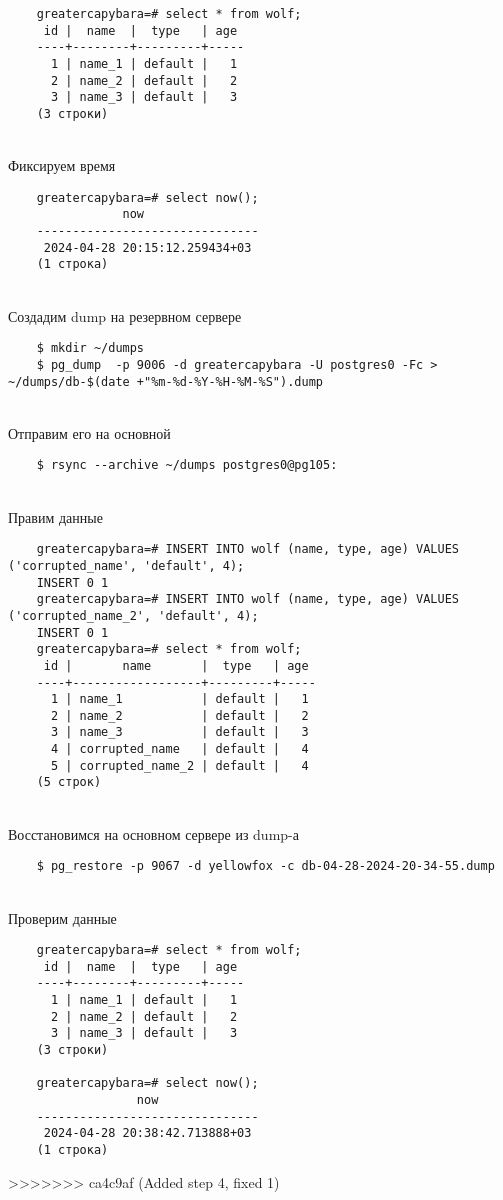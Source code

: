 \documentclass{article}
\begin{document}
\begin{verbatim}
    greatercapybara=# select * from wolf;
     id |  name  |  type   | age
    ----+--------+---------+-----
      1 | name_1 | default |   1
      2 | name_2 | default |   2
      3 | name_3 | default |   3
    (3 строки)
\end{verbatim} \\
Фиксируем время

\begin{verbatim}
    greatercapybara=# select now();
                now
    -------------------------------
     2024-04-28 20:15:12.259434+03
    (1 строка)
\end{verbatim} \\
Создадим dump на резервном сервере

\begin{verbatim}
    $ mkdir ~/dumps
    $ pg_dump  -p 9006 -d greatercapybara -U postgres0 -Fc > ~/dumps/db-$(date +"%m-%d-%Y-%H-%M-%S").dump
\end{verbatim} \\
Отправим его на основной

\begin{verbatim}
    $ rsync --archive ~/dumps postgres0@pg105:
\end{verbatim} \\
Правим данные

\begin{verbatim}
    greatercapybara=# INSERT INTO wolf (name, type, age) VALUES ('corrupted_name', 'default', 4);
    INSERT 0 1
    greatercapybara=# INSERT INTO wolf (name, type, age) VALUES ('corrupted_name_2', 'default', 4);
    INSERT 0 1
    greatercapybara=# select * from wolf;
     id |       name       |  type   | age
    ----+------------------+---------+-----
      1 | name_1           | default |   1
      2 | name_2           | default |   2
      3 | name_3           | default |   3
      4 | corrupted_name   | default |   4
      5 | corrupted_name_2 | default |   4
    (5 строк)
\end{verbatim} \\
Восстановимся на основном сервере из dump-а

\begin{verbatim}
    $ pg_restore -p 9067 -d yellowfox -c db-04-28-2024-20-34-55.dump
\end{verbatim} \\
Проверим данные

\begin{verbatim}
    greatercapybara=# select * from wolf;
     id |  name  |  type   | age
    ----+--------+---------+-----
      1 | name_1 | default |   1
      2 | name_2 | default |   2
      3 | name_3 | default |   3
    (3 строки)
    
    greatercapybara=# select now();
                  now
    -------------------------------
     2024-04-28 20:38:42.713888+03
    (1 строка)
\end{verbatim}

>>>>>>> ca4c9af (Added step 4, fixed 1)
\end{document}
